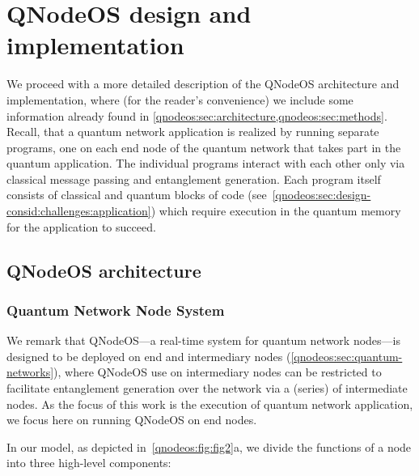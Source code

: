 \section{QNodeOS design and implementation}
\label{qnodeos:sec:design}

We proceed with a more detailed description of the \ac{QNodeOS} architecture and implementation, where (for the reader's convenience) we include some information already found in \cref{qnodeos:sec:architecture,qnodeos:sec:methods}. Recall, that a quantum network application is realized by running separate programs, one on each end node of the quantum network that takes part in the quantum application. The individual programs interact with each other only via classical message passing and entanglement generation. Each program itself consists of classical and quantum blocks of code (see~\cref{qnodeos:sec:design-consid:challenges:application}) which require execution in the quantum memory for the application to succeed.

\subsection{QNodeOS architecture}
\label{qnodeos:sec:appendix-arch}

\subsubsection{Quantum Network Node System}
\label{qnodeos:sec:appendix-arch-node_system}

We remark that \ac{QNodeOS}---a real-time system for quantum network nodes---is designed to be deployed on end and intermediary nodes (\cref{qnodeos:sec:quantum-networks}), where \ac{QNodeOS} use on intermediary nodes can be restricted to facilitate entanglement generation over the network via a (series) of intermediate nodes.
As the focus of this work is the execution of quantum network application, we focus here on running \ac{QNodeOS} on end nodes.

In our model, as depicted in~\cref{qnodeos:fig:fig2}a, we divide the functions of a node into three high-level components:


